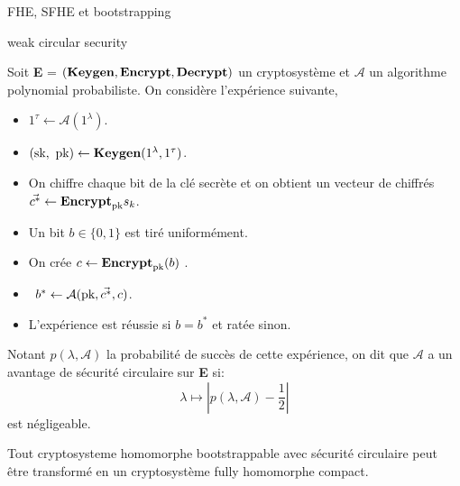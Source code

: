 \begin{section}{FHE, SFHE et bootstrapping}
\begin{definition}{weak circular security}

\label{def:circular}
Soit \textbf{E} = $(\text{\textbf{Keygen}}, \text{\textbf{Encrypt}}, \text{\textbf{Decrypt}})$ un cryptosystème et $\mathcal{A}$ un
algorithme polynomial probabiliste. 
On considère l'expérience suivante, 
\begin{itemize}
\item $1^\tau \leftarrow \mathcal{A}(1^\lambda)$.
\item $(\sk, \pk) \leftarrow \Keygen(1^\lambda, 1^\tau)$.
\item On chiffre chaque bit de la clé secrète et on obtient un vecteur de chiffrés $\vec{c^*} \leftarrow \text{\textbf{Encrypt}}_{\text{pk}}{s_k}$.
\item Un bit $b\in \{0,1\}$ est tiré uniformément.
\item On crée $c \leftarrow \text{\textbf{Encrypt}}_{\text{pk}}(b)$ .
\item $b^* \leftarrow \mathcal{A}(\text{pk}, \vec{c^*}, c)$.
\item L'expérience est réussie si $b = b^*$ et ratée sinon.
\end{itemize}
Notant $p(\lambda, \mathcal{A})$ la probabilité de succès de cette expérience, on dit
que $\mathcal{A}$ a un avantage de sécurité circulaire sur \textbf{E} si:
\[\lambda \mapsto |p(\lambda, \mathcal{A}) - \frac{1}{2}| \]
est négligeable.
\end{definition}

\begin{thm}
Tout cryptosysteme homomorphe bootstrappable avec sécurité circulaire peut être transformé en un 
cryptosystème fully homomorphe compact.
\end{thm}
\end{section}
